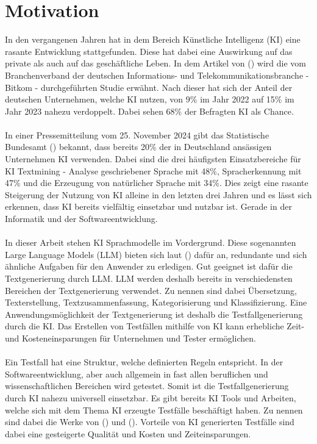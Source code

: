 \documentclass[12pt,toc=bib,toc=listof]{scrreprt}
\begin{document}
\section{Motivation} %
\label{sec:motivation}
In den vergangenen Jahren hat in dem Bereich Künstliche Intelligenz (KI) eine rasante Entwicklung stattgefunden. Diese hat dabei eine Auswirkung auf das private als auch auf das geschäftliche Leben. In dem Artikel von (\cite{StreimHecker2023}) wird die vom Branchenverband der deutschen Informations- und Telekommunikationsbranche - Bitkom - durchgeführten Studie erwähnt. Nach dieser hat sich der Anteil der deutschen Unternehmen, welche KI nutzen, von 9\% im Jahr 2022 auf 15\% im Jahr 2023 nahezu verdoppelt. Dabei sehen 68\% der Befragten KI als Chance.\\
\\
In einer Pressemitteilung vom 25. November 2024 gibt das Statistische Bundesamt (\cite{StatistischesBundesamt2024}) bekannt, dass bereits 20\% der in Deutschland ansässigen Unternehmen KI verwenden. Dabei sind die drei häufigsten Einsatzbereiche für KI Textmining - Analyse geschriebener Sprache mit 48\%, Spracherkennung mit 47\% und die Erzeugung von natürlicher Sprache mit 34\%. Dies zeigt eine rasante Steigerung der Nutzung von KI alleine in den letzten drei Jahren und es lässt sich erkennen, dass KI bereits vielfältig einsetzbar und nutzbar ist. Gerade in der Informatik und der Softwareentwicklung.\\
\\
In dieser Arbeit stehen KI Sprachmodelle im Vordergrund. Diese sogenannten Large Language Models (LLM) bieten sich laut (\cite{Kerner2024}) dafür an, redundante und sich ähnliche Aufgaben für den Anwender zu erledigen. Gut geeignet ist dafür die Textgenerierung durch LLM. LLM werden deshalb bereits in verschiedensten Bereichen der Textgenerierung verwendet. Zu nennen sind dabei Übersetzung, Texterstellung, Textzusammenfassung, Kategorisierung und Klassifizierung. Eine Anwendungsmöglichkeit der Textgenerierung ist deshalb die Testfallgenerierung durch die KI. Das Erstellen von Testfällen mithilfe von KI kann erhebliche Zeit- und Kosteneinsparungen für Unternehmen und Tester ermöglichen.\\
\\
Ein Testfall hat eine Struktur, welche definierten Regeln entspricht. In der Softwareentwicklung, aber auch allgemein in fast allen beruflichen und wissenschaftlichen Bereichen wird getestet. Somit ist die Testfallgenerierung durch KI nahezu universell einsetzbar. Es gibt bereits KI Tools und Arbeiten, welche sich mit dem Thema KI erzeugte Testfälle beschäftigt haben. Zu nennen sind dabei die Werke von (\cite{Bozic2022}) und (\cite{WeingartzSuleymanov2024}). Vorteile von KI generierten Testfälle sind dabei eine gesteigerte Qualität und Kosten und Zeiteinsparungen.\\
\end{document}
